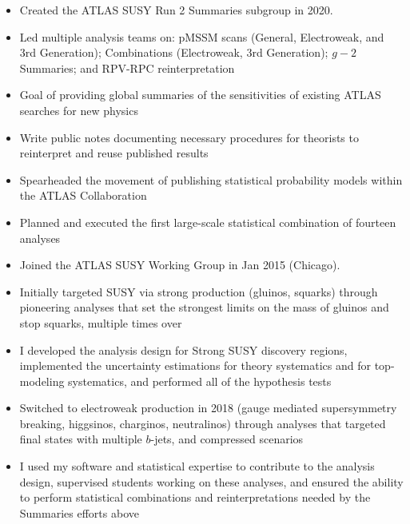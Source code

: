 \begin{itemize}
	\setlength{\itemsep}{0em}
	\item Created the ATLAS SUSY Run 2 Summaries subgroup in 2020.
	\item Led multiple analysis teams on: pMSSM scans (General, Electroweak, and 3rd Generation); Combinations (Electroweak, 3rd Generation); $g-2$ Summaries; and RPV-RPC reinterpretation
	\item Goal of providing global summaries of the sensitivities of existing ATLAS searches for new physics
	\item Write public notes documenting necessary procedures for theorists to reinterpret and reuse published results
	\item Spearheaded the movement of publishing statistical probability models within the ATLAS Collaboration
	\item Planned and executed the first large-scale statistical combination of fourteen analyses
\end{itemize}


\begin{itemize}
	\setlength{\itemsep}{0em}
	\item Joined the ATLAS SUSY Working Group in Jan 2015 (Chicago).
	\item Initially targeted SUSY via strong production (gluinos, squarks) through pioneering analyses that set the strongest limits on the mass of gluinos and stop squarks, multiple times over
	\item I developed the analysis design for Strong SUSY discovery regions, implemented the uncertainty estimations for theory systematics and for top-modeling systematics, and performed all of the hypothesis tests
	\item Switched to electroweak production in 2018 (gauge mediated supersymmetry breaking, higgsinos, charginos, neutralinos) through analyses that targeted final states with multiple $b$-jets, and compressed scenarios
	\item I used my software and statistical expertise to contribute to the analysis design, supervised students working on these analyses, and ensured the ability to perform statistical combinations and reinterpretations needed by the Summaries efforts above
\end{itemize}


